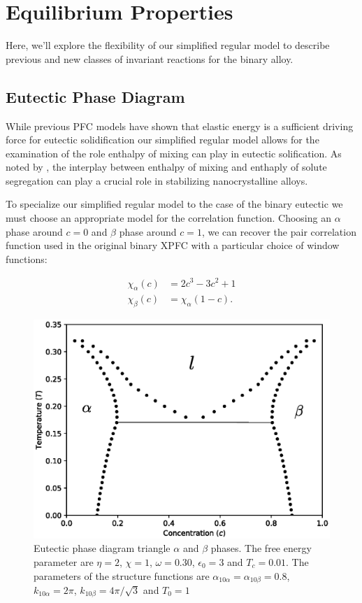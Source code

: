 \documentclass[showkeys, prb, reprint]{revtex4-1}
\begin{document}
\section{Equilibrium Properties}

Here, we'll explore the flexibility of our simplified regular model to describe previous and new classes of invariant reactions for the binary alloy.

\subsection{Eutectic Phase Diagram}

While previous PFC models have shown that elastic energy is a sufficient driving force for eutectic solidification our simplified regular model allows for the examination of the role enthalpy of mixing can play in eutectic solification. As noted by \cite{murdoch}, the interplay between enthalpy of mixing and enthaply of solute segregation can play a crucial role in stabilizing nanocrystalline alloys.

To specialize our simplified regular model to the case of the binary eutectic we must choose an appropriate model for the correlation function. Choosing an $\alpha$ phase around $c = 0$ and $\beta$ phase around $c = 1$, we can recover the pair correlation function used in the original binary XPFC with a particular choice of window functions: 

\begin{align}
   \chi_\alpha(c) &= 2c^3 - 3c^2 + 1 \\
   \chi_\beta(c) &= \chi_\alpha(1 - c).
\end{align}

\begin{figure}
	\includegraphics[scale=0.4]{eutectic}
	\caption{\label{eutectic} Eutectic phase diagram triangle $\alpha$ and $\beta$ phases. The free energy parameter are $\eta = 2$, $\chi = 1$, $\omega=0.30$, $\epsilon_0 = 3$ and $T_c = 0.01$. The parameters of the structure functions are $\alpha_{10\alpha} = \alpha_{10\beta} = 0.8$, $k_{10\alpha} = 2\pi$, $k_{10\beta} = 4\pi/\sqrt{3}$ and $T_0 = 1$}
\end{figure}
\end{document}
